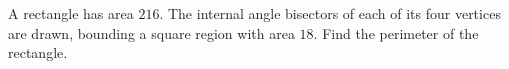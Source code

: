A rectangle has area $216$. The internal angle bisectors of each of its four vertices are drawn, bounding a square region with area $18$. Find the perimeter of the rectangle.
